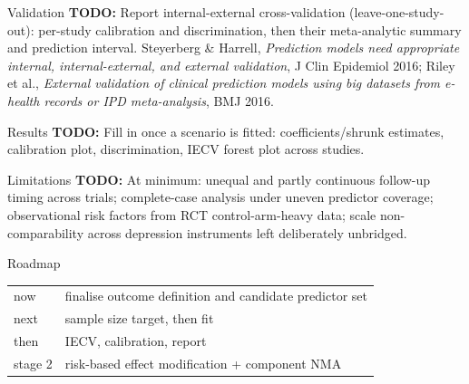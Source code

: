 \documentclass[11pt, t, handout]{beamer}
\newcommand{\todo}[1]{\textcolor{red!70!black}{\textbf{TODO:} #1}}
\begin{document}
\begin{frame}{Validation}
  \pause
  \todo{Report internal-external cross-validation (leave-one-study-out):
  per-study calibration and discrimination, then their meta-analytic
  summary and prediction interval.}
  \vspace{8pt}
  \pause
  {\footnotesize Steyerberg \& Harrell, \emph{Prediction models need
   appropriate internal, internal-external, and external validation},
   J Clin Epidemiol 2016; Riley et al., \emph{External validation of
   clinical prediction models using big datasets from e-health records or
   IPD meta-analysis}, BMJ 2016.}
\end{frame}

\begin{frame}{Results}
  \pause
  \todo{Fill in once a scenario is fitted: coefficients/shrunk estimates,
  calibration plot, discrimination, IECV forest plot across studies.}
\end{frame}

\begin{frame}{Limitations}
  \pause
  \todo{At minimum: unequal and partly continuous follow-up timing across
  trials; complete-case analysis under uneven predictor coverage;
  observational risk factors from RCT control-arm-heavy data; scale
  non-comparability across depression instruments left deliberately
  unbridged.}
\end{frame}

\begin{frame}{Roadmap}
  \pause
  \begin{center}\footnotesize
  \begin{tabular}{ll}
    \toprule
    now & finalise outcome definition and candidate predictor set \\
    next & sample size target, then fit \\
    then & IECV, calibration, report \\
    stage 2 & risk-based effect modification + component NMA \\
    \bottomrule
  \end{tabular}
  \end{center}
\end{frame}
\end{document}
